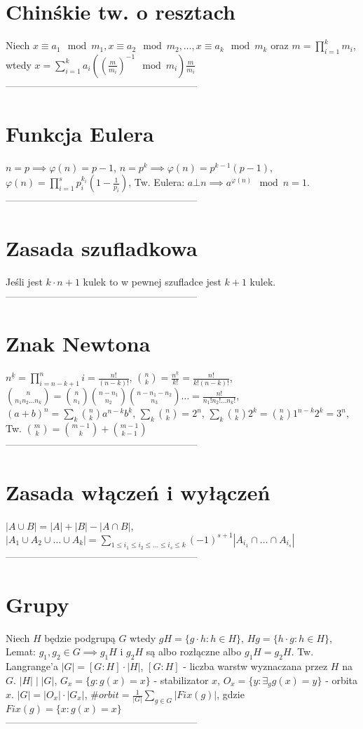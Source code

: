 \documentclass{article}
\begin{document}
\begin{minipage}[t]{.325\textwidth}
\section*{Chinśkie tw. o resztach}
Niech $x \equiv a_1 \mod m_1, x \equiv a_2 \mod m_2, … , x \equiv a_k \mod m_k $ oraz $m = \prod_{i=1}^k m_i$, wtedy $x = \sum_{i=1}^{k}a_i\left((\frac{m}{m_i})^{-1}\mod m_i\right)\frac{m}{m_i}$\\
-----------------------------------------------------------
\section*{Funkcja Eulera}
$n = p \implies \varphi(n) = p -1$, $n = p^k \implies \varphi(n) = p^{k-1}(p-1)$, $\varphi(n) = \prod_{i=1}^sp_i^{k_i}(1-\frac{1}{p_i})$, Tw. Eulera: $a\bot n \implies a^{\varphi(n)}\mod n = 1$.\\
-----------------------------------------------------------
\section*{Zasada szufladkowa}
Jeśli jest $k\cdot n + 1$ kulek to w pewnej szufladce jest $k+1$ kulek.\\
-----------------------------------------------------------
\section*{Znak Newtona}
$n^{\underline{k}} = \prod_{i = n-k+1}^{n} i = \frac{n!}{(n-k)!}$, $\binom{n}{k} = \frac{n^{\underline{k}}}{k!} = \frac{n!}{k!(n-k)!}$, $\binom{n}{n_1 n_2 … n_k} = \binom{n}{n_1}\binom{n-n_1}{n_2}\binom{n - n_1 - n_2}{n_3}… = \frac{n!}{n_1!n_2!…n_k!}$, $(a+b)^n = \sum_k \binom{n}{k}a^{n-k}b^k$, $\sum_{k}\binom{n}{k} = 2^n$, $\sum_k \binom{n}{k}2^k = \binom{n}{k}1^{n-k}2^k = 3^n$, Tw. $\binom{m}{k} = \binom{m-1}{k} + \binom{m-1}{k-1}$\\
-----------------------------------------------------------
\section*{Zasada włączeń i wyłączeń}
$|A\cup B| = |A| + |B| - |A \cap B|$, $|A_1 \cup A_2 \cup … \cup  A_k| = \sum_{1 \leq i_1 \leq i_2 \leq … \leq i_s \leq k} (-1)^{s+1} |A_{i_1}  \cap … \cap A_{i_s}|$\\
-----------------------------------------------------------
\section*{Grupy}
Niech $H$ będzie podgrupą $G$ wtedy $gH = \{g\cdot h : h \in H\}$, $Hg = \{h\cdot g : h \in H\}$, Lemat: $g_1,g_2 \in G \implies g_1H $ i $g_2H$ są albo rozłączne albo $g_1H = g_2H$. Tw. Langrange'a $|G| = [G:H] \cdot |H|$, $[G:H]$ - liczba warstw wyznaczana przez $H$ na $G$. $|H| \mid |G|$, $G_x = \{g : g(x) = x\}$ - stabilizator $x$, $O_x = \{y:\exists_g g(x) = y\}$ - orbita $x$. $|G| = |O_x| \cdot |G_x|$, $\#orbit  = \frac{1}{|G|}\sum_{g\in G}|Fix(g)|$, gdzie $Fix(g) = \{x:g(x) = x\}$\\
-----------------------------------------------------------


\end{minipage}
\end{document}

